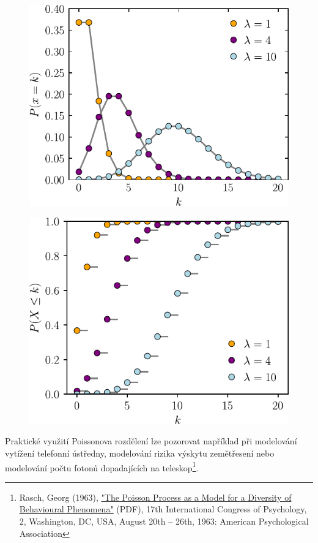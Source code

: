 \documentclass[12pt, a4paper]{article}
\begin{document}
    \begin{figure}[!ht]
        \centering
        \begin{minipage}{.5\textwidth}
            \centering
            \includegraphics[width=.95\linewidth]{pdf/pmf.pdf}
            \label{fig:test1}
        \end{minipage}%
        \begin{minipage}{.5\textwidth}
            \centering
            \includegraphics[width=.95\linewidth]{pdf/cdf.pdf}
            \label{fig:test2}
        \end{minipage}
    \end{figure}

    Praktické využití Poissonova rozdělení lze pozorovat například při modelování vytížení telefonní ústředny, modelování rizika výskytu zemětřesení nebo modelování počtu fotonů dopadajících na teleskop\footnote{Rasch, Georg (1963), \hyperlink{http://www.rasch.org/memo1963.pdf}{"The Poisson Process as a Model for a Diversity of Behavioural Phenomena"} (PDF), 17th International Congress of Psychology, 2, Washington, DC, USA, August 20th – 26th, 1963: American Psychological Association}.
\end{document}

